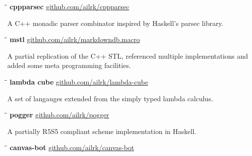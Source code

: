 \documentclass{res}
\begin{document}
\begin{resume}
    \vspace{-0.1in}
    \begin{tabbing}
        \hspace{2.4in}\= \hspace{0.9in}\= \kill
        {\bf cppparsec } \>               \>\url{github.com/ailrk/cppparsec}\\

    \end{tabbing}\vspace{-30pt}
    A C++ monadic parser combinator inspired by Haskell's parsec library.

    \vspace{-0.2in}
    \begin{tabbing}
        \hspace{2.4in}\= \hspace{0.9in}\= \kill
        {\bf mstl } \>               \>\url{github.com/ailrk/markdowndb.macro}\\
    \end{tabbing}\vspace{-30pt}
    A partial replication of the C++ STL, referenced multiple implementations and added some meta programming facilities.

    \vspace{-0.2in}
    \begin{tabbing}
        \hspace{2.4in}\= \hspace{0.9in}\= \kill
        {\bf lambda cube} \>               \>\url{github.com/ailrk/lambda-cube}\\

    \end{tabbing}\vspace{-30pt}
    A set of langauges extended from the simply typed lambda calculus.

    \vspace{-0.2in}
    \begin{tabbing}
        \hspace{2.4in}\= \hspace{0.9in}\= \kill
        {\bf pogger } \>               \>\url{github.com/ailrk/pogger}\\

    \end{tabbing}\vspace{-30pt}
    A partially R5S5 compliant scheme implementation in Haskell.

    \vspace{-0.2in}
    \begin{tabbing}
        \hspace{2.4in}\= \hspace{0.9in}\= \kill
        {\bf canvas-bot} \>               \>\url{github.com/ailrk/canvas-bot}\\


\end{tabbing}
\end{resume}
\end{document}
